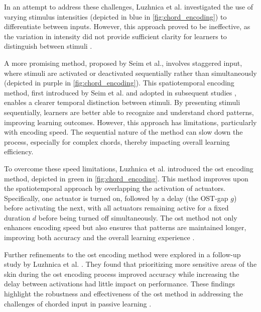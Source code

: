 In an attempt to address these challenges, Luzhnica et al. investigated the use of varying stimulus intensities (depicted in blue in \autoref{fig:chord_encoding}) to differentiate between inputs. However, this approach proved to be ineffective, as the variation in intensity did not provide sufficient clarity for learners to distinguish between stimuli \cite{Luzhnica2017}.

A more promising method, proposed by Seim et al., involves staggered input, where stimuli are activated or deactivated sequentially rather than simultaneously (depicted in purple in \autoref{fig:chord_encoding}). This spatiotemporal encoding method, first introduced by Seim et al. \cite{Seim2014a} and adopted in subsequent studies \cite{Seim2014}, enables a clearer temporal distinction between stimuli. By presenting stimuli sequentially, learners are better able to recognize and understand chord patterns, improving learning outcomes. However, this approach has limitations, particularly with encoding speed. The sequential nature of the method can slow down the process, especially for complex chords, thereby impacting overall learning efficiency.

To overcome these speed limitations, Luzhnica et al. introduced the \gls{ost} encoding method, depicted in green in \autoref{fig:chord_encoding}. This method improves upon the spatiotemporal approach by overlapping the activation of actuators. Specifically, one actuator is turned on, followed by a delay (the OST-gap $g$) before activating the next, with all actuators remaining active for a fixed duration $d$ before being turned off simultaneously. The \gls{ost} method not only enhances encoding speed but also ensures that patterns are maintained longer, improving both accuracy and the overall learning experience \cite{Luzhnica2018, Luzhnica2018a, Luzhnica2017, Luzhnica2016}.

Further refinements to the \gls{ost} encoding method were explored in a follow-up study by Luzhnica et al. \cite{Luzhnica2017}. They found that prioritizing more sensitive areas of the skin during the \gls{ost} encoding process improved accuracy while increasing the delay between activations had little impact on performance. These findings highlight the robustness and effectiveness of the \gls{ost} method in addressing the challenges of chorded input in passive learning \cite{Luzhnica2017}.

